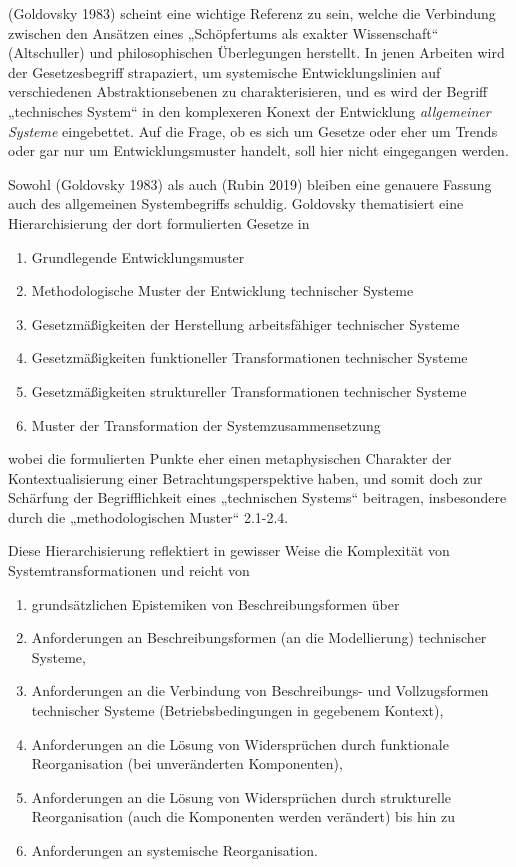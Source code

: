 \documentclass[11pt,a4paper]{article}
\begin{document}
(Goldovsky 1983) scheint eine wichtige Referenz zu sein, welche die Verbindung
zwischen den Ansätzen eines „Schöpfertums als exakter Wissenschaft“
(Altschuller) und philosophischen Überlegungen herstellt.  In jenen Arbeiten
wird der Gesetzesbegriff strapaziert, um systemische Entwicklungslinien auf
verschiedenen Abstraktionsebenen zu charakterisieren, und es wird der Begriff
„technisches System“ in den komplexeren Konext der Entwicklung
\emph{allgemeiner Systeme} eingebettet. Auf die Frage, ob es sich um Gesetze
oder eher um Trends oder gar nur um Entwicklungsmuster handelt, soll hier
nicht eingegangen werden.

Sowohl (Goldovsky 1983) als auch (Rubin 2019) bleiben eine genauere Fassung
auch des allgemeinen Systembegriffs schuldig. Goldovsky thematisiert eine
Hierarchisierung der dort formulierten Gesetze in

\begin{enumerate}[noitemsep]
\item Grundlegende Entwicklungsmuster
\item Methodologische Muster der Entwicklung technischer Systeme
\item Gesetzmäßigkeiten der Herstellung arbeitsfähiger technischer Systeme
\item Gesetzmäßigkeiten funktioneller Transformationen technischer Systeme
\item Gesetzmäßigkeiten struktureller Transformationen technischer Systeme
\item Muster der Transformation der Systemzusammensetzung
\end{enumerate}
wobei die formulierten Punkte eher einen metaphysischen Charakter der
Kontextualisierung einer Betrachtungsperspektive haben, und somit doch zur
Schärfung der Begriff\-lichkeit eines „technischen Systems“ beitragen,
insbesondere durch die „methodologischen Muster“ 2.1-2.4.

Diese Hierarchisierung reflektiert in gewisser Weise die Komplexität von
Systemtransformationen und reicht von
\begin{enumerate}[noitemsep]
\item grundsätzlichen Epistemiken von Beschreibungsformen über
\item Anforderungen an Beschreibungsformen (an die Modellierung) technischer
  Systeme,
\item Anforderungen an die Verbindung von Beschreibungs- und Vollzugsformen
  technischer Systeme (Betriebsbedingungen in gegebenem Kontext),
\item Anforderungen an die Lösung von Widersprüchen durch funktionale
  Reorganisation (bei unveränderten Komponenten),
\item Anforderungen an die Lösung von Widersprüchen durch strukturelle
  Reorganisation (auch die Komponenten werden verändert) bis hin zu
\item Anforderungen an systemische Reorganisation.
\end{enumerate}
\end{document}
